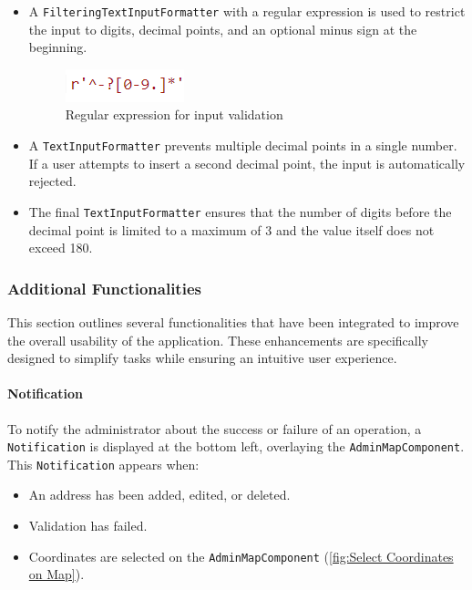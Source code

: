     \begin{itemize}
        \item A \texttt{FilteringTextInputFormatter} with a regular expression is used to restrict the input to digits, decimal points, and an optional minus sign at the beginning.
        \begin{figure}[H]
            \centering
            \includegraphics[width=0.2\linewidth]{images/AdminPanel/regexInputFormatter.png}
            \caption{Regular expression for input validation}
        \end{figure}
        \item A \texttt{TextInputFormatter} prevents multiple decimal points in a single number. If a user attempts to insert a second decimal point, the input is automatically rejected.
        \item The final \texttt{TextInputFormatter} ensures that the number of digits before the decimal point is limited to a maximum of 3 and the value itself does not exceed 180.
    \end{itemize}
    
\newpage


\subsubsection{Additional Functionalities}
    This section outlines several functionalities that have been integrated to improve the overall usability of the application. These enhancements are specifically designed to simplify tasks while ensuring an intuitive user experience.

\paragraph{Notification}
\label{fig:Notification}

    To notify the administrator about the success or failure of an operation, a \texttt{Notification} is displayed at the bottom left, overlaying the \texttt{AdminMapComponent}. This \texttt{Notification} appears when:

    \begin{itemize}
        \item An address has been added, edited, or deleted.
        \item Validation has failed.
        \item Coordinates are selected on the \texttt{AdminMapComponent} (\ref{fig:Select Coordinates on Map}).
    \end{itemize}


